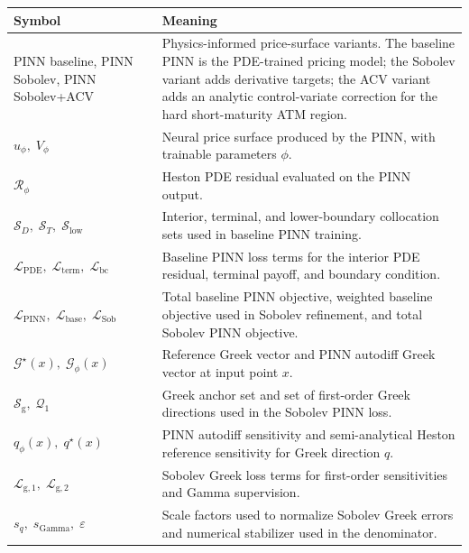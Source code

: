 \begin{table}[H]
    {\begin{tabular}{|P{4.0cm}|P{7.8cm}|}
        \hline
        \textbf{Symbol} & \textbf{Meaning} \\
        \hline
        PINN baseline, PINN Sobolev, PINN Sobolev+ACV & Physics-informed price-surface variants. The baseline PINN is the PDE-trained pricing model; the Sobolev variant adds derivative targets; the ACV variant adds an analytic control-variate correction for the hard short-maturity ATM region. \\
        \hline
        $u_\phi,\;V_\phi$ & Neural price surface produced by the PINN, with trainable parameters $\phi$. \\
        \hline
        $\mathcal{R}_\phi$ & Heston PDE residual evaluated on the PINN output. \\
        \hline
        $\mathcal{S}_D,\;\mathcal{S}_T,\;\mathcal{S}_{\mathrm{low}}$ & Interior, terminal, and lower-boundary collocation sets used in baseline PINN training. \\
        \hline
        $\mathcal{L}_{\mathrm{PDE}},\;\mathcal{L}_{\mathrm{term}},\;\mathcal{L}_{\mathrm{bc}}$ & Baseline PINN loss terms for the interior PDE residual, terminal payoff, and boundary condition. \\
        \hline
        $\mathcal{L}_{\mathrm{PINN}},\;\mathcal{L}_{\mathrm{base}},\;\mathcal{L}_{\mathrm{Sob}}$ & Total baseline PINN objective, weighted baseline objective used in Sobolev refinement, and total Sobolev PINN objective. \\
        \hline
        $\mathcal{G}^{\star}(x),\;\mathcal{G}_{\phi}(x)$ & Reference Greek vector and PINN autodiff Greek vector at input point $x$. \\
        \hline
        $\mathcal{S}_{\mathrm{g}},\;\mathcal{Q}_1$ & Greek anchor set and set of first-order Greek directions used in the Sobolev PINN loss. \\
        \hline
        $q_{\phi}(x),\;q^{\star}(x)$ & PINN autodiff sensitivity and semi-analytical Heston reference sensitivity for Greek direction \(q\). \\
        \hline
        $\mathcal{L}_{\mathrm{g},1},\;\mathcal{L}_{\mathrm{g},2}$ & Sobolev Greek loss terms for first-order sensitivities and Gamma supervision. \\
        \hline
        $s_q,\;s_{\mathrm{Gamma}},\;\varepsilon$ & Scale factors used to normalize Sobolev Greek errors and numerical stabilizer used in the denominator. \\

\end{tabular}}
\end{table}
